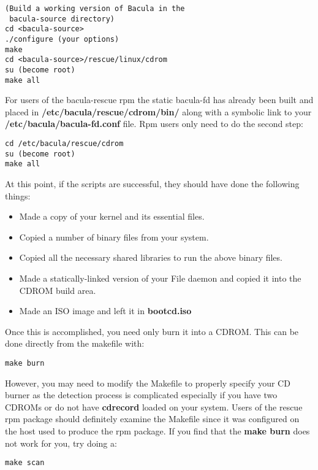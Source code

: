 \footnotesize
\begin{verbatim}
(Build a working version of Bacula in the
 bacula-source directory)
cd <bacula-source>
./configure (your options)
make
cd <bacula-source>/rescue/linux/cdrom
su (become root)
make all
\end{verbatim}
\normalsize

For users of the bacula-rescue rpm the static bacula-fd has already been built
and placed in {\bf /etc/bacula/rescue/cdrom/bin/} along with a symbolic link
to your {\bf /etc/bacula/bacula-fd.conf} file. Rpm users only need to do the
second step: 

\footnotesize
\begin{verbatim}
cd /etc/bacula/rescue/cdrom
su (become root)
make all
\end{verbatim}
\normalsize

At this point, if the scripts are successful, they should have done the
following things: 

\begin{itemize}
\item Made a copy of your kernel and its essential files.  
\item Copied a number of binary files from your system.  
\item Copied all the necessary shared libraries to run the above  binary
   files.  
\item Made a statically-linked version of your File daemon and  copied it into
   the CDROM build area.  
\item Made an ISO image and left it in {\bf bootcd.iso} 
   \end{itemize}

Once this is accomplished, you need only burn it into a CDROM. This can be
done directly from the makefile with: 

\footnotesize
\begin{verbatim}
make burn
\end{verbatim}
\normalsize

However, you may need to modify the Makefile to properly specify your CD
burner as the detection process is complicated especially if you have two
CDROMs or do not have {\bf cdrecord} loaded on your system. Users of the
rescue rpm package should definitely examine the Makefile since it was
configured on the host used to produce the rpm package. If you find that the
{\bf make burn} does not work for you, try doing a: 

\footnotesize
\begin{verbatim}
make scan
\end{verbatim}
\normalsize

